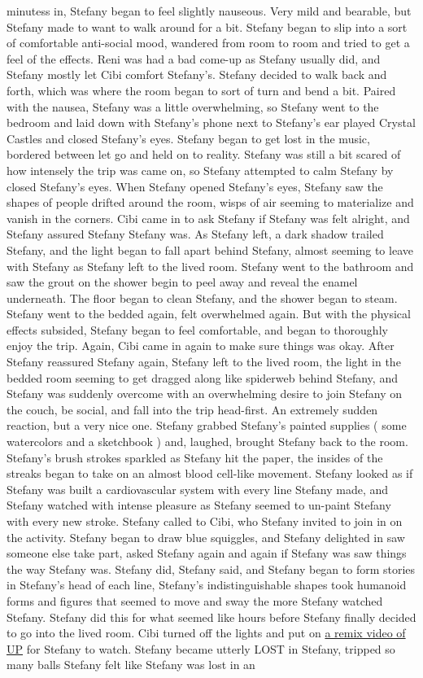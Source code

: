 \documentclass[12pt]{book}
\begin{document}
minutess in, Stefany began to feel slightly nauseous. Very mild and bearable, but Stefany made to want to walk around for a bit. Stefany began to slip into a sort of comfortable anti-social mood, wandered from room to room and tried to get a feel of the effects. Reni was had a bad come-up as Stefany usually did, and Stefany mostly let Cibi comfort Stefany's. Stefany decided to walk back and forth, which was where the room began to sort of turn and bend a bit. Paired with the nausea, Stefany was a little overwhelming, so Stefany went to the bedroom and laid down with Stefany's phone next to Stefany's ear played Crystal Castles and closed Stefany's eyes. Stefany began to get lost in the music, bordered between let go and held on to reality. Stefany was still a bit scared of how intensely the trip was came on, so Stefany attempted to calm Stefany by closed Stefany's eyes. When Stefany opened Stefany's eyes, Stefany saw the shapes of people drifted around the room, wisps of air seeming to materialize and vanish in the corners. Cibi came in to ask Stefany if Stefany was felt alright, and Stefany assured Stefany Stefany was. As Stefany left, a dark shadow trailed Stefany, and the light began to fall apart behind Stefany, almost seeming to leave with Stefany as Stefany left to the lived room. Stefany went to the bathroom and saw the grout on the shower begin to peel away and reveal the enamel underneath. The floor began to clean Stefany, and the shower began to steam. Stefany went to the bedded again, felt overwhelmed again. But with the physical effects subsided, Stefany began to feel comfortable, and began to thoroughly enjoy the trip. Again, Cibi came in again to make sure things was okay. After Stefany reassured Stefany again, Stefany left to the lived room, the light in the bedded room seeming to get dragged along like spiderweb behind Stefany, and Stefany was suddenly overcome with an overwhelming desire to join Stefany on the couch, be social, and fall into the trip head-first. An extremely sudden reaction, but a very nice one. Stefany grabbed Stefany's painted supplies ( some watercolors and a sketchbook ) and, laughed, brought Stefany back to the room. Stefany's brush strokes sparkled as Stefany hit the paper, the insides of the streaks began to take on an almost blood cell-like movement. Stefany looked as if Stefany was built a cardiovascular system with every line Stefany made, and Stefany watched with intense pleasure as Stefany seemed to un-paint Stefany with every new stroke. Stefany called to Cibi, who Stefany invited to join in on the activity. Stefany began to draw blue squiggles, and Stefany delighted in saw someone else take part, asked Stefany again and again if Stefany was saw things the way Stefany was. Stefany did, Stefany said, and Stefany began to form stories in Stefany's head of each line, Stefany's indistinguishable shapes took humanoid forms and figures that seemed to move and sway the more Stefany watched Stefany. Stefany did this for what seemed like hours before Stefany finally decided to go into the lived room. Cibi turned off the lights and put on \href{https://www.youtube.com/watch?v=A2yt1ooLQGo}{a remix video of UP} for Stefany to watch. Stefany became utterly LOST in Stefany, tripped so many balls Stefany felt like Stefany was lost in an 
\end{document}
